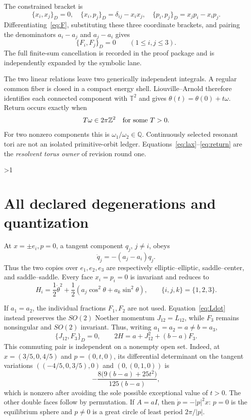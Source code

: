 \documentclass[10pt]{article}
\providecommand{\CRevisionRound}{2}
\newcommand{\TT}{\mathbb T}
\begin{document}
The constrained bracket is
\[
 \{x_i,x_j\}_D=0,\quad
 \{x_i,p_j\}_D=\delta_{ij}-x_ix_j,\quad
 \{p_i,p_j\}_D=x_jp_i-x_ip_j.
\]
Differentiating~\eqref{eq:F}, substituting these three coordinate brackets,
and pairing the denominators $a_i-a_j$ and $a_j-a_i$ gives
\begin{equation}\label{eq:commute}
 \{F_i,F_j\}_D=0\qquad(1\le i,j\le3).
\end{equation}
The full finite-sum cancellation is recorded in the proof package and is
independently expanded by the symbolic lane.

The two linear relations leave two generically independent integrals.  A
regular common fiber is closed in a compact energy shell.  Liouville--Arnold
therefore identifies each connected component with $\TT^2$ and gives
$\theta(t)=\theta(0)+t\omega$.  Return occurs exactly when
\begin{equation}\label{eq:return}
 T\omega\in2\pi\mathbb Z^2\quad\hbox{for some }T>0.
\end{equation}
For two nonzero components this is $\omega_1/\omega_2\in\mathbb Q$.
Continuously selected resonant tori are not an isolated primitive-orbit
ledger.  Equations~\eqref{eq:lax}--\eqref{eq:return} are the
\emph{resolvent torus owner} of revision round one.
\fi

\ifnum\CRevisionRound>1
\section{All declared degenerations and quantization}\label{sec:boundary}
At $x=\pm e_i,p=0$, a tangent component $q_j$, $j\ne i$, obeys
\[
 \ddot q_j=-(a_j-a_i)q_j.
\]
Thus the two copies over $e_1,e_2,e_3$ are respectively
elliptic--elliptic, saddle--center, and saddle--saddle.  Every face
$x_i=p_i=0$ is invariant and reduces to
\[
 H_i=\frac12\dot\theta^2+\frac12
     (a_j\cos^2\theta+a_k\sin^2\theta),
 \qquad \{i,j,k\}=\{1,2,3\}.
\]

If $a_1=a_2$, the individual fractions $F_1,F_2$ are not used.
Equation~\eqref{eq:Ldot} instead preserves the $SO(2)$ Noether momentum
$J_{12}=L_{12}$, while $F_3$ remains nonsingular and $SO(2)$ invariant.  Thus,
writing $a_1=a_2=a\ne b=a_3$,
\begin{equation}\label{eq:double}
 \{J_{12},F_3\}_D=0,\qquad
 2H=a+J_{12}^2+(b-a)F_3.
\end{equation}
This commuting pair is independent on a nonempty open set.  Indeed, at
$x=(3/5,0,4/5)$ and $p=(0,t,0)$, its differential determinant on the tangent
variations $((-4/5,0,3/5),0)$ and $(0,(0,1,0))$ is
\[
 -\frac{8\bigl(9(b-a)+25t^2\bigr)}{125(b-a)},
\]
which is nonzero after avoiding the sole possible exceptional value of
$t>0$.  The other double faces follow by permutation.  If $A=aI$, then
$\dot p=-|p|^2x$: $p=0$ is the
equilibrium sphere and $p\ne0$ is a great circle of least period
$2\pi/|p|$.
\end{document}
